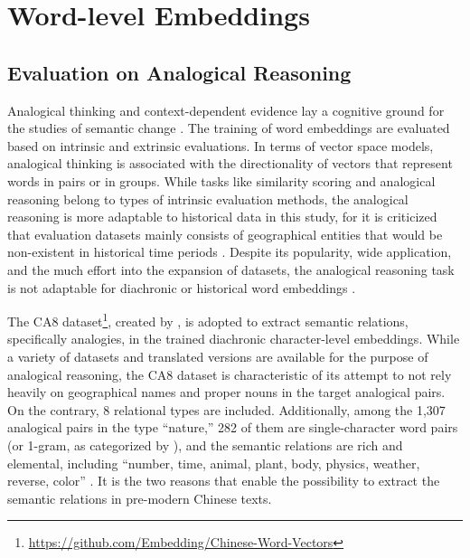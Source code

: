 
\section{Word-level Embeddings}

\subsection{Evaluation on Analogical Reasoning}
Analogical thinking and context-dependent evidence lay a cognitive ground for the studies of semantic change \parencite{traugott2017semantic}. The training of word embeddings are evaluated based on intrinsic and extrinsic evaluations. In terms of vector space models, analogical thinking is associated with the directionality of vectors that represent words in pairs or in groups. While tasks like similarity scoring and analogical reasoning belong to types of intrinsic evaluation methods, the analogical reasoning is more adaptable to historical data in this study, for it is criticized that evaluation datasets mainly consists of geographical entities that would be non-existent in historical time periods \parencite{wevers2020digital,li2018analogical}. Despite its popularity, wide application, and the much effort into the expansion of datasets, the analogical reasoning task is not adaptable for diachronic or historical word embeddings \parencite{wevers2020digital}.

The CA8 dataset\footnote{\url{https://github.com/Embedding/Chinese-Word-Vectors}}, created by \textcite{li2018analogical}, is adopted to extract semantic relations, specifically analogies, in the trained diachronic character-level embeddings. While a variety of datasets and translated versions are available for the purpose of analogical reasoning, the CA8 dataset is characteristic of its attempt to not rely heavily on geographical names and proper nouns in the target analogical pairs. On the contrary, 8 relational types are included. Additionally, among the 1,307 analogical pairs in the type ``nature,'' 282 of them are single-character word pairs (or 1-gram, as categorized by \textcite{li2018analogical}), and the semantic relations are rich and elemental, including ``number, time, animal, plant, body, physics, weather, reverse, color'' \parencite{li2018analogical}. It is the two reasons that enable the possibility to extract the semantic relations in pre-modern Chinese texts.

